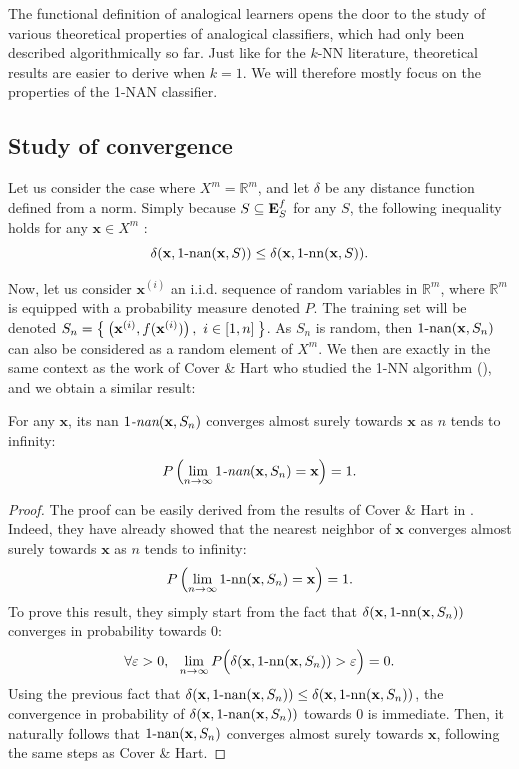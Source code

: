 The functional definition of analogical learners opens the door to the study of
various theoretical properties of analogical classifiers, which had only been
described algorithmically so far. Just like for the $k$-NN literature,
theoretical results are easier to derive when $k = 1$. We will therefore mostly
focus on the properties of the 1-NAN classifier.
\subsection{Study of convergence}

Let us consider the case where $X^m=\mathbb{R}^m$, and let $\delta$ be any
distance function defined from a norm. Simply because $S \subseteq \mathbf{E}_{S}^{f}$ for
any $S$, the
following inequality holds for any $\mathbf{x} \in X^m$ :
$$\delta(\mathbf{x}, 1\text{-nan}(\mathbf{x},S)) \leq \delta(\mathbf{x},
1\mbox{-nn}(\mathbf{x},S)).$$


Now, let us consider  $\mathbf{x}^{(i)}$ an i.i.d. sequence of random variables
in $\mathbb{R}^m$, where $\mathbb{R}^m$ is equipped with a probability measure
denoted $P$. The training set will be denoted
$S_n=\Set{\left(\mathbf{x}^{(i)},f(\mathbf{x}^{(i)}) \right), ~ i
\in [1, n]}$. As $S_n$ is random, then $1\text{-nan}(\mathbf{x},S_n)$ can also be
considered as a random element of $X^m$.  We then are exactly in the same
context as the work of Cover \& Hart who studied the 1-NN algorithm
(\cite{CovHarTIT67}), and we obtain a similar result:
\begin{property}
  \label{PROPER:convergence_nan}
  For any $\mathbf{x}$, its nan $1\emph{-nan}(\mathbf{x}, S_n)$ converges almost
  surely towards $\mathbf{x}$ as $n$ tends to infinity:
  $$P\left(\lim_{n \to \infty} 1\emph{-nan}(\mathbf{x}, S_n) = \mathbf{x}\right) =
  1.$$
\end{property}
\begin{proof}
  The proof can be easily derived from the results of Cover \& Hart in
  \cite{CovHarTIT67}. Indeed, they have already showed that the nearest neighbor of
  $\mathbf{x}$ converges almost surely towards $\mathbf{x}$ as $n$ tends to
  infinity:
  $$P\left(\lim_{n \to \infty} 1\mbox{-nn}(\mathbf{x}, S_n) = \mathbf{x}\right) =
  1.$$
  To prove this result, they simply start from the fact that
  $\delta(\mathbf{x}, 1\mbox{-nn}(\mathbf{x}, S_n))$ converges in probability towards
  $0$:
  $$\forall \varepsilon > 0,~~\lim_{n \to \infty}P\Big(\delta(\mathbf{x}, 1\mbox{-nn}(\mathbf{x}, S_n)) >
  \varepsilon\Big) = 0.$$
  Using the previous fact that $\delta(\mathbf{x}, 1\text{-nan}(\mathbf{x},S_n)) \leq
  \delta(\mathbf{x}, 1\mbox{-nn}(\mathbf{x},S_n))$, the convergence in probability of
  $\delta(\mathbf{x}, 1\text{-nan}(\mathbf{x},S_n))$ towards $0$ is immediate. Then, it
  naturally follows that $1\text{-nan}(\mathbf{x}, S_n)$ converges almost surely
  towards $\mathbf{x}$, following the same steps as Cover \& Hart.
\end{proof}

